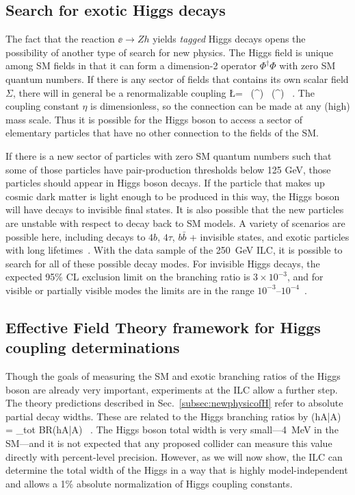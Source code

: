 \subsection{Search for exotic Higgs decays}

The fact that the reaction $\ee\to Zh$ yields {\it tagged} Higgs decays opens the 
possibility of another type of search for new physics.
The Higgs field is unique among SM fields in that it can form a dimension-2 operator 
$\Phi^\dagger \Phi$ with zero SM quantum numbers.  If there is any sector of fields that contains its own scalar field $\Sigma$, there will in general be a renormalizable coupling 
\beq
          \Delta \L   =   \eta\    (\Phi^\dagger \Phi) \, (\Sigma^\dagger \Sigma)  \ .
The coupling constant $\eta$ is dimensionless, so the connection can be made at any (high) mass scale.   Thus it is possible for the Higgs boson to access a sector of elementary particles that have no other connection to the fields of the SM. 

If there is a new sector of particles with zero SM quantum numbers such that some of those particles have pair-production thresholds below 125 GeV, those particles should appear in Higgs boson decays.   If the particle that makes up cosmic dark matter is light enough to be produced in this way, the Higgs boson will have decays to invisible final states.   It is also possible that the new particles are unstable with respect to decay back to SM models.   A variety of scenarios are possible here, including decays to $4b$,
$4\tau$, $b\bar b$ + invisible states, and exotic particles with long lifetimes~\cite{Curtin:2013fra}.   With the data sample of the 250~GeV ILC, it is possible to search for all of these possible decay modes.   For  invisible Higgs decays, the expected 95\% CL exclusion limit on the  branching ratio is  $3\times 10^{-3}$, 
and for 
visible or partially visible modes the limits are in the range $10^{-3}$--$10^{-4}$~\cite{Liu:2016zki}. 

\subsection{Effective Field Theory framework for Higgs coupling determinations}
\label{subsec:phys_eft}

Though the goals of measuring the SM and exotic branching ratios of the Higgs boson are already very important, experiments at the ILC allow a further step.   The theory predictions described in Sec.~\ref{subsec:newphysicofH} refer to absolute partial decay widths.   These are 
related to the Higgs branching ratios by 
\beq
           \Gamma(h\to A\bar A) =   \Gamma_{tot} \cdot BR(h\to A\bar A)  \  .
\eeqn
The Higgs boson total width is very small---4~MeV in the SM---and it is not expected that any proposed collider can measure this value directly  with percent-level precision.
However, as we will now show, the ILC can determine the total width of the Higgs in a 
way that is highly model-independent and allows a 1\% absolute normalization of Higgs coupling constants.

